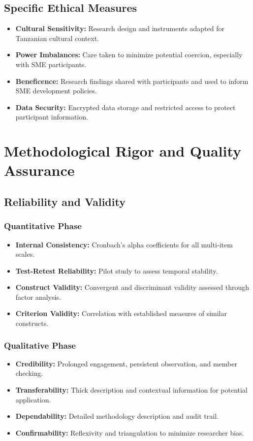 \begin{enumerate}
\subsection{Specific Ethical Measures}
\begin{itemize}
    \item \textbf{Cultural Sensitivity:} Research design and instruments adapted for Tanzanian cultural context.
    \item \textbf{Power Imbalances:} Care taken to minimize potential coercion, especially with SME participants.
    \item \textbf{Beneficence:} Research findings shared with participants and used to inform SME development policies.
    \item \textbf{Data Security:} Encrypted data storage and restricted access to protect participant information.
\end{itemize}

\section{Methodological Rigor and Quality Assurance}

\subsection{Reliability and Validity}

\subsubsection{Quantitative Phase}
\begin{itemize}
    \item \textbf{Internal Consistency:} Cronbach's alpha coefficients for all multi-item scales.
    \item \textbf{Test-Retest Reliability:} Pilot study to assess temporal stability.
    \item \textbf{Construct Validity:} Convergent and discriminant validity assessed through factor analysis.
    \item \textbf{Criterion Validity:} Correlation with established measures of similar constructs.
\end{itemize}

\subsubsection{Qualitative Phase}
\begin{itemize}
    \item \textbf{Credibility:} Prolonged engagement, persistent observation, and member checking.
    \item \textbf{Transferability:} Thick description and contextual information for potential application.
    \item \textbf{Dependability:} Detailed methodology description and audit trail.
    \item \textbf{Confirmability:} Reflexivity and triangulation to minimize researcher bias.
\end{itemize}


\end{enumerate}

